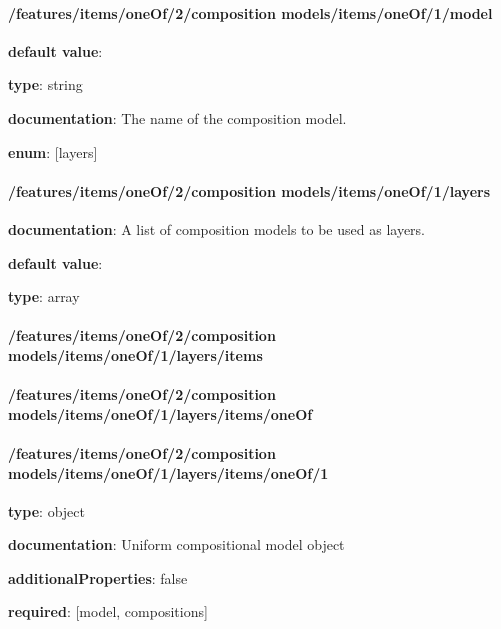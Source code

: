 \paragraph{/features/items/oneOf/2/composition models/items/oneOf/1/model} \begin{itemized}
\item {\bf default value}: 
\item {\bf type}: string
\item {\bf documentation}: The name of the composition model.
\item {\bf enum}: [layers]\end{itemized}\paragraph{/features/items/oneOf/2/composition models/items/oneOf/1/layers} \begin{itemized}
\item {\bf documentation}: A list of composition models to be used as layers.
\item {\bf default value}: 
\item {\bf type}: array
\paragraph{/features/items/oneOf/2/composition models/items/oneOf/1/layers/items} \begin{itemized}
\end{itemized}\end{itemized}\paragraph{/features/items/oneOf/2/composition models/items/oneOf/1/layers/items/oneOf} \begin{itemized}
\end{itemized}\paragraph{/features/items/oneOf/2/composition models/items/oneOf/1/layers/items/oneOf/1} \begin{itemized}
\item {\bf type}: object
\item {\bf documentation}: Uniform compositional model object
\item {\bf additionalProperties}: false
\item {\bf required}: [model, compositions]\end{itemized}
